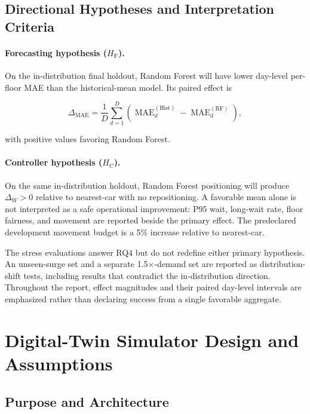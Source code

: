 \documentclass[12pt]{article}
\begin{document}
\subsection{Directional Hypotheses and Interpretation Criteria}

\paragraph{Forecasting hypothesis ($H_{\mathrm{F}}$).}
On the in-distribution final holdout, Random Forest will have lower day-level
per-floor MAE than the historical-mean model. Its paired effect is

\begin{equation}
  \Delta_{\mathrm{MAE}} = \frac{1}{D}\sum_{d=1}^{D}
  \left(\operatorname{MAE}_{d}^{(\mathrm{Hist})}
  -\operatorname{MAE}_{d}^{(\mathrm{RF})}\right),
  \label{eq:paired-forecast-effect}
\end{equation}

with positive values favoring Random Forest.

\paragraph{Controller hypothesis ($H_{\mathrm{C}}$).}
On the same in-distribution holdout, Random Forest positioning will produce
$\Delta_W>0$ relative to nearest-car with no repositioning. A favorable mean
alone is not interpreted as a safe operational improvement: P95 wait,
long-wait rate, floor fairness, and movement are reported beside the primary
effect. The predeclared development movement budget is a 5\% increase relative
to nearest-car.

The stress evaluations answer RQ4 but do not redefine either primary
hypothesis. An unseen-surge set and a separate 1.5$\times$-demand set are
reported as distribution-shift tests, including results that contradict the
in-distribution direction. Throughout the report, effect magnitudes and their
paired day-level intervals are emphasized rather than declaring success from a
single favorable aggregate.

\section{Digital-Twin Simulator Design and Assumptions}
\label{sec:simulator}

\subsection{Purpose and Architecture}
\end{document}
